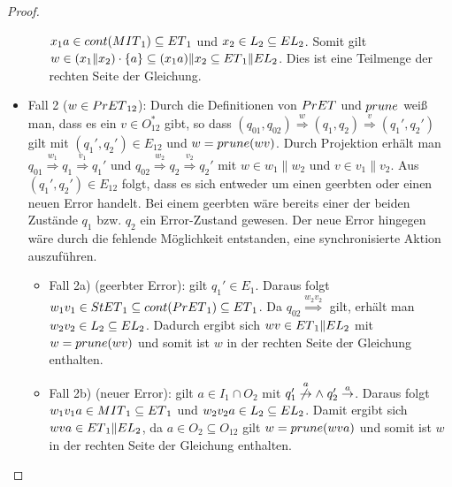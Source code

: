 \begin{proof}
\begin{itemize}
\begin{itemize}
      $x_1a\in cont{}(MIT{}_1)\subseteq ET{}_1$ und $x_2\in L_2\subseteq EL{}_2$. Somit
      gilt $w\in (x_1\| x_2)\cdot\{a\}\subseteq (x_1a)\|x_2\subseteq ET{}_1\|EL{}_2$.
      Dies ist eine Teilmenge der rechten Seite der Gleichung.
  \end{itemize}
    \item Fall 2 ($w\in PrET{}_{12}$): Durch die Definitionen von $PrET{}$
      und $prune{}$ weiß man, dass es ein $v\in O_{12}^*$ gibt, so dass
      $(q_{01},q_{02}) \overset{w}{\Rightarrow} (q_1,q_2)
      \overset{v}{\Rightarrow} (q_1',q_2')$ gilt mit $(q_1',q_2')\in E_{12}$
      und $w=prune{}(wv)$. Durch Projektion erhält man $q_{01}
      \overset{w_1}{\Rightarrow} q_1 \overset{v_1}{\Rightarrow} q_1'$ und
      $q_{02} \overset{w_2}{\Rightarrow} q_2 \overset{v_2}{\Rightarrow} q_2'$
      mit $w\in w_1\|w_2$ und $v\in v_1\|v_2$. Aus $(q_1',q_2')\in E_{12}$
      folgt, dass es sich entweder um einen geerbten oder einen neuen Error
      handelt. Bei einem geerbten wäre bereits einer der beiden Zustände $q_1$
      bzw. $q_2$ ein Error-Zustand gewesen. Der neue Error hingegen wäre durch
      die fehlende Möglichkeit entstanden, eine synchronisierte Aktion
      auszuführen.
      \begin{itemize}
        \item Fall 2a) (geerbter Error): \OBdA{} gilt $q_1'\in E_1$. Daraus folgt
          $w_1v_1\in StET{}_1\subseteq cont{}(PrET{}_1)\subseteq ET{}_1$.
          Da $q_{02}\overset{w_2v_2}{\Rightarrow}$ gilt, erhält man $w_2v_2\in
          L_2\subseteq EL{}_2$. Dadurch ergibt sich $wv\in ET{}_1\|EL{}_2$ mit
          $w=prune{}(wv)$ und somit ist $w$ in der rechten Seite der Gleichung
          enthalten.
        \item Fall 2b) (neuer Error): \OBdA{} gilt $a\in I_1\cap O_2$ mit
          $q_1'\overset{a}{\not{\hspace{-0.1cm}\rightarrow}} \wedge \; q_2'
          \overset{a}{\rightarrow}$. Daraus folgt $w_1v_1a\in MIT{}_1\subseteq
          ET{}_1$ und $w_2v_2a\in L_2\subseteq EL{}_2$. Damit ergibt sich $wva\in
          ET{}_1\|EL{}_2$, da $a\in O_2\subseteq O_{12}$ gilt $w=prune{}(wva)$ und
          somit ist $w$ in der rechten Seite der Gleichung enthalten.
      \end{itemize}
  \end{itemize}


\end{proof}
